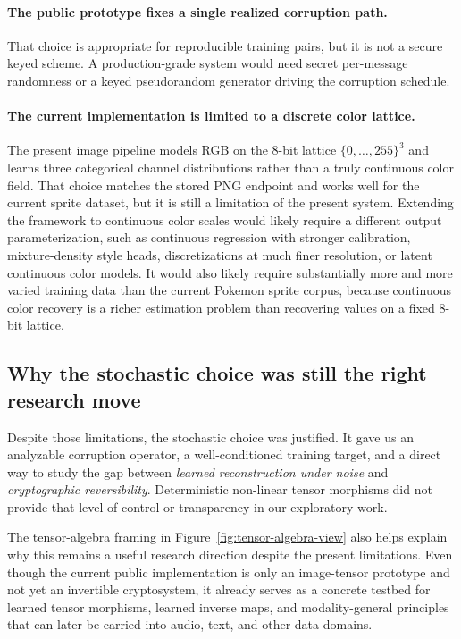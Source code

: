 \documentclass[11pt]{article}
\begin{document}
\paragraph{The public prototype fixes a single realized corruption path.}
That choice is appropriate for reproducible training pairs, but it is not a secure keyed scheme. A production-grade system would need secret per-message randomness or a keyed pseudorandom generator driving the corruption schedule.

\paragraph{The current implementation is limited to a discrete color lattice.}
The present image pipeline models RGB on the $8$-bit lattice $\{0,\dots,255\}^3$ and learns three categorical channel distributions rather than a truly continuous color field. That choice matches the stored PNG endpoint and works well for the current sprite dataset, but it is still a limitation of the present system. Extending the framework to continuous color scales would likely require a different output parameterization, such as continuous regression with stronger calibration, mixture-density style heads, discretizations at much finer resolution, or latent continuous color models. It would also likely require substantially more and more varied training data than the current Pokemon sprite corpus, because continuous color recovery is a richer estimation problem than recovering values on a fixed 8-bit lattice.

\subsection{Why the stochastic choice was still the right research move}
Despite those limitations, the stochastic choice was justified. It gave us an analyzable corruption operator, a well-conditioned training target, and a direct way to study the gap between \emph{learned reconstruction under noise} and \emph{cryptographic reversibility}. Deterministic non-linear tensor morphisms did not provide that level of control or transparency in our exploratory work.

The tensor-algebra framing in Figure~\ref{fig:tensor-algebra-view} also helps explain why this remains a useful research direction despite the present limitations. Even though the current public implementation is only an image-tensor prototype and not yet an invertible cryptosystem, it already serves as a concrete testbed for learned tensor morphisms, learned inverse maps, and modality-general principles that can later be carried into audio, text, and other data domains.
\end{document}
